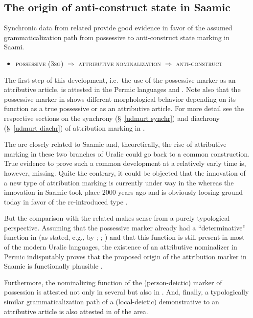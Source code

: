 {\subsection{The origin of anti\hyp{}construct state in Saamic}
Synchronic data from related  provide good evidence in favor of the assumed grammaticalization path from possessive to anti\hyp{}construct state marking in Saami.
\begin{itemize}
\item \textsc{possessive} (\textsc{3sg}) $\Rightarrow$ \textsc{attributive nominalization} $\Rightarrow$ \textsc{anti}-\textsc{construct}
\end{itemize}
The first step of this development, i.e.~the use of the possessive marker as an attributive article, is attested in the Permic languages  and . Note also that the possessive marker in  shows different morphological behavior depending on its function as a true possessive or as an attributive article. For more detail see the respective sections on the synchrony (\S~\ref{udmurt synchr}) and diachrony (\S~\ref{udmurt diachr}) of attribution marking in .

The  are closely related to Saamic and, theoretically, the rise of attributive marking in these two branches of Uralic could go back to a common  construction. True evidence to prove such a common development at a relatively early time is, however, missing. Quite the contrary, it could be objected that the innovation of a new type of attribution marking is currently under way in the  whereas the innovation in Saamic took place 2000 years ago and is obviously loosing ground today in favor of the re-introduced type .

But the comparison with the related  makes sense from a purely typological perspective. Assuming that the possessive marker already had a “determinative” function in  (as stated, e.g., by \citealt[32]{janhunen1981}; \citealt[66, 81]{decsy1990}; \citealt{kunnap2004}) and that this function is still present in most of the modern Uralic languages, the existence of an attributive nominalizer in Permic indisputably proves that the proposed origin of the attribution marker in Saamic is functionally plausible \citep{riesler2006b}.

Furthermore, the nominalizing function of the (person-deictic) marker of possession is attested not only in several  but also in . And, finally, a typologically similar grammaticalization path of a (local-deictic) demonstrative to an attributive article is also attested in  of the area.

}

